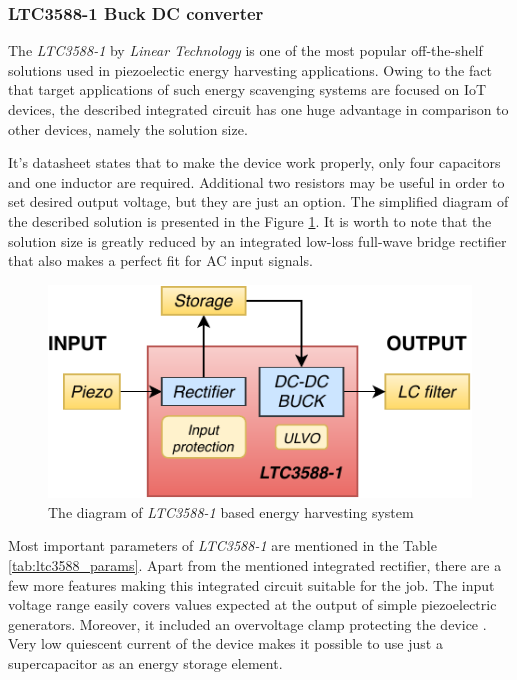 \documentclass[12pt,a4paper]{article}
\begin{document}
\subsubsection{LTC3588-1 Buck DC converter}
The \textit{LTC3588-1} by \textit{Linear Technology} is one of the most popular off-the-shelf solutions used in piezoelectic energy harvesting applications. Owing to the fact that target applications of such energy scavenging systems are focused on IoT devices, the described integrated circuit has one huge advantage in comparison to other devices, namely the solution size.
\par
It's datasheet \cite{ltc3588_params} states that to make the device work properly, only four capacitors and one inductor are required. Additional two resistors may be useful in order to set desired output voltage, but they are just an option. The simplified diagram of the described solution is presented in the Figure \ref{fig:ltc3588diagram}. It is worth to note that the solution size is greatly reduced by an integrated low-loss full-wave bridge rectifier that also makes a perfect fit for AC input signals.

\begin{figure}[ht!]
\includegraphics[scale=1.2]{LTC3588.pdf}
\caption{The diagram of \textit{LTC3588-1} based energy harvesting system}
\label{fig:ltc3588diagram}
\end{figure}

\par

Most important parameters of \textit{LTC3588-1} are mentioned in the Table \ref{tab:ltc3588_params}. Apart from the mentioned integrated rectifier, there are a few more features making this integrated circuit suitable for the job.  The input voltage range easily covers values expected at the output of simple piezoelectric generators. Moreover, it included an overvoltage clamp protecting the device \cite{ltc3588_params}. Very low quiescent current of the device makes it possible to use just a supercapacitor as an energy storage element.
\end{document}
